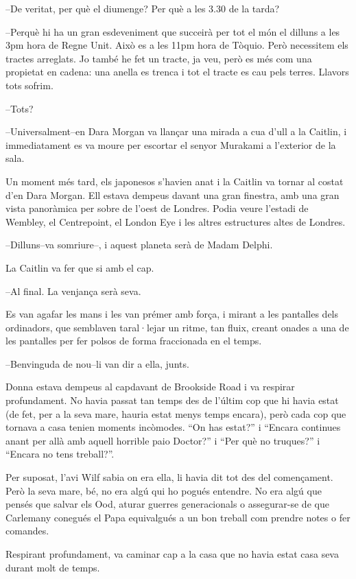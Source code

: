 --De veritat, per què el diumenge? Per què a les 3.30 de la tarda?

--Perquè hi ha un gran esdeveniment que succeirà per tot el món el
dilluns a les 3pm hora de Regne Unit. Això es a les 11pm hora de Tòquio.
Però necessitem els tractes arreglats. Jo també he fet un tracte, ja
veu, però es més com una propietat en cadena: una anella es trenca i tot
el tracte es cau pels terres. Llavors tots sofrim.

--Tots?

--Universalment--en Dara Morgan va llançar una mirada a cua d'ull a la
Caitlin, i immediatament es va moure per escortar el senyor Murakami a
l'exterior de la sala.

Un moment més tard, els japonesos s'havien anat i la Caitlin va tornar
al costat d'en Dara Morgan. Ell estava dempeus davant una gran finestra,
amb una gran vista panoràmica per sobre de l'oest de Londres. Podia
veure l'estadi de Wembley, el Centrepoint, el London Eye i les altres
estructures altes de Londres.

--Dilluns--va somriure--, i aquest planeta serà de Madam Delphi.

La Caitlin va fer que si amb el cap.

--Al final. La venjança serà seva.

Es van agafar les mans i les van prémer amb força, i mirant a les
pantalles dels ordinadors, que semblaven taral·lejar un ritme, tan
fluix, creant onades a una de les pantalles per fer polsos de forma
fraccionada en el temps.

--Benvinguda de nou--li van dir a ella, junts.

Donna estava dempeus al capdavant de Brookside Road i va respirar
profundament. No havia passat tan temps des de l'últim cop que hi havia
estat (de fet, per a la seva mare, hauria estat menys temps encara),
però cada cop que tornava a casa tenien moments incòmodes. ``On has
estat?'' i ``Encara continues anant per allà amb aquell horrible paio
Doctor?'' i ``Per què no truques?'' i ``Encara no tens treball?''.

Per suposat, l'avi Wilf sabia on era ella, li havia dit tot des del
començament. Però la seva mare, bé, no era algú qui ho pogués entendre.
No era algú que pensés que salvar els Ood, aturar guerres generacionals
o assegurar-se de que Carlemany conegués el Papa equivalgués a un bon
treball com prendre notes o fer comandes.

Respirant profundament, va caminar cap a la casa que no havia estat casa
seva durant molt de temps.

